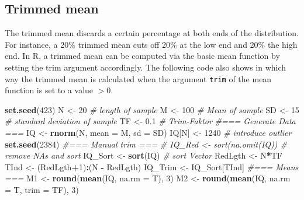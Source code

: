 \documentclass[
]{article}
\newenvironment{Shaded}{\begin{snugshade}}{\end{snugshade}}
\newcommand{\AttributeTok}[1]{\textcolor[rgb]{0.13,0.29,0.53}{#1}}
\newcommand{\CommentTok}[1]{\textcolor[rgb]{0.56,0.35,0.01}{\textit{#1}}}
\newcommand{\DecValTok}[1]{\textcolor[rgb]{0.00,0.00,0.81}{#1}}
\newcommand{\FloatTok}[1]{\textcolor[rgb]{0.00,0.00,0.81}{#1}}
\newcommand{\FunctionTok}[1]{\textcolor[rgb]{0.13,0.29,0.53}{\textbf{#1}}}
\newcommand{\NormalTok}[1]{#1}
\newcommand{\OtherTok}[1]{\textcolor[rgb]{0.56,0.35,0.01}{#1}}
\newcommand{\SpecialCharTok}[1]{\textcolor[rgb]{0.81,0.36,0.00}{\textbf{#1}}}
\begin{document}
\subsection*{Trimmed mean}\label{trimmed-mean}

The trimmed mean discards a certain percentage at both ends of the distribution. For instance, a 20\% trimmed mean cuts off 20\% at the low end and 20\% the high end. In R, a trimmed mean can be computed via the basic mean function by setting the trim argument accordingly. The following code also shows in which way the trimmed mean is calculated when the argument \texttt{trim} of the mean function is set to a value \(> 0\).

\begin{Shaded}
\begin{Highlighting}[]
  \FunctionTok{set.seed}\NormalTok{(}\DecValTok{423}\NormalTok{)}
\NormalTok{  N       }\OtherTok{\textless{}{-}} \DecValTok{20} \CommentTok{\# length of sample}
\NormalTok{  M       }\OtherTok{\textless{}{-}} \DecValTok{100} \CommentTok{\# Mean of sample}
\NormalTok{  SD      }\OtherTok{\textless{}{-}} \DecValTok{15}  \CommentTok{\# standard deviation of sample}
\NormalTok{  TF      }\OtherTok{\textless{}{-}} \FloatTok{0.1} \CommentTok{\# Trim{-}Faktor}
  \CommentTok{\#=== Generate Data ===}
\NormalTok{  IQ      }\OtherTok{\textless{}{-}} \FunctionTok{rnorm}\NormalTok{(N, }\AttributeTok{mean =}\NormalTok{ M, }\AttributeTok{sd =}\NormalTok{ SD)}
\NormalTok{  IQ[N]   }\OtherTok{\textless{}{-}} \DecValTok{1240} \CommentTok{\# introduce outlier}
  \FunctionTok{set.seed}\NormalTok{(}\DecValTok{2384}\NormalTok{)}
  \CommentTok{\#=== Manual trim ===}
  \CommentTok{\# IQ\_Red  \textless{}{-} sort(na.omit(IQ)) \# remove NA\textquotesingle{}s and sort}
\NormalTok{  IQ\_Sort }\OtherTok{\textless{}{-}} \FunctionTok{sort}\NormalTok{(IQ) }\CommentTok{\# sort Vector}
\NormalTok{  RedLgth }\OtherTok{\textless{}{-}}\NormalTok{ N}\SpecialCharTok{*}\NormalTok{TF}
\NormalTok{  TInd    }\OtherTok{\textless{}{-}}\NormalTok{ (RedLgth}\SpecialCharTok{+}\DecValTok{1}\NormalTok{)}\SpecialCharTok{:}\NormalTok{(N }\SpecialCharTok{{-}}\NormalTok{ RedLgth)}
\NormalTok{  IQ\_Trim }\OtherTok{\textless{}{-}}\NormalTok{ IQ\_Sort[TInd]}
  \CommentTok{\#=== Means ===}
\NormalTok{  M1      }\OtherTok{\textless{}{-}} \FunctionTok{round}\NormalTok{(}\FunctionTok{mean}\NormalTok{(IQ, }\AttributeTok{na.rm =}\NormalTok{ T), }\DecValTok{3}\NormalTok{)}
\NormalTok{  M2      }\OtherTok{\textless{}{-}} \FunctionTok{round}\NormalTok{(}\FunctionTok{mean}\NormalTok{(IQ, }\AttributeTok{na.rm =}\NormalTok{ T, }\AttributeTok{trim =}\NormalTok{ TF), }\DecValTok{3}\NormalTok{)}

\end{Highlighting}
\end{Shaded}
\end{document}
